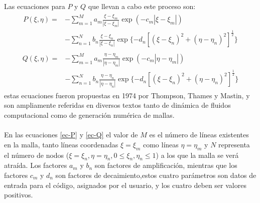 \documentclass[letterpaper, openright, 12pt]{book}
\begin{document}
    \paragraph*{}
        Las ecuaciones para $P$ y $Q$ que llevan a cabo este proceso son:
        \begin{align}
            \begin{aligned}
                P(\xi, \eta) =& - \sum_{m = 1}^{M} a_{m} \frac{\xi - \xi_{m}}{|\xi - \xi_{m}|} \exp(-c_{m}|\xi - \xi_{m}|) \\&
                - \sum_{n=1}^{N} b_{n} \frac{\xi - \xi_{n}}{| \xi - \xi_{n} |} \exp\lbrace -d_{n} \left[ \left( \xi - \xi_{n} \right)^2 + \left( \eta - \eta_{n} \right)^2 \right]^\frac{1}{2} \rbrace
            \end{aligned}
            \label{ec-P}
        \end{align}
        \begin{align}
            \begin{aligned}
                Q(\xi, \eta) =& - \sum_{m = 1}^{M} a_{m} \frac{\eta - \eta_{m}}{|\eta - \eta_{m}|} \exp(-c_{m}|\eta - \eta_{m}|) \\&
                - \sum_{n=1}^{N} b_{n} \frac{\eta - \eta_{n}}{| \eta - \eta_{n} |} \exp\lbrace -d_{n} \left[ \left( \xi - \xi_{n} \right)^2 + \left( \eta - \eta_{n} \right)^2 \right]^\frac{1}{2} \rbrace
            \end{aligned}
            \label{ec-Q}
        \end{align}
        estas ecuaciones fueron propuestas en 1974 por Thompson, Thames y
        Mastin\cite{thompson1974automatic}, y son ampliamente referidas en
        diversos textos tanto de dinámica de fluidos computacional como de
        generación numérica de mallas.
    \paragraph*{}
        En las ecuaciones \ref{ec-P} y \ref{ec-Q} el valor de $M$ es el número
        de líneas existentes en la malla, tanto líneas coordenadas
        $\xi = \xi_{m}$ como líneas $\eta = \eta_{m}$ y $N$ representa el número
        de nodos ($\xi = \xi_{n}, \eta = \eta_{n}, 0 \leq \xi_{n}, \eta_{n} \leq 1$)
        a los que la malla se verá atraída. Los factores $a_{m}$ y $b_{n}$ son
        factores de amplificación, mientras que los factores $c_{m}$ y $d_{n}$
        son factores de decaimiento,estos cuatro parámetros son datos de entrada
        para el código, asignados por el usuario, y los cuatro deben ser valores
        positivos.
\end{document}
